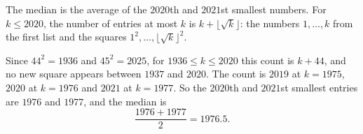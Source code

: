 The median is the average of the $2020$th and $2021$st smallest numbers. For $k\le2020$, the number of entries at most $k$ is $k+\lfloor\sqrt k\rfloor$: the numbers $1,\dots,k$ from the first list and the squares $1^2,\dots,\lfloor\sqrt k\rfloor^2$.

Since $44^2=1936$ and $45^2=2025$, for $1936\le k\le2020$ this count is $k+44$, and no new square appears between $1937$ and $2020$. The count is $2019$ at $k=1975$, $2020$ at $k=1976$ and $2021$ at $k=1977$. So the $2020$th and $2021$st smallest entries are $1976$ and $1977$, and the median is
\[\dfrac{1976+1977}{2}=\boxed{1976.5}.\]
